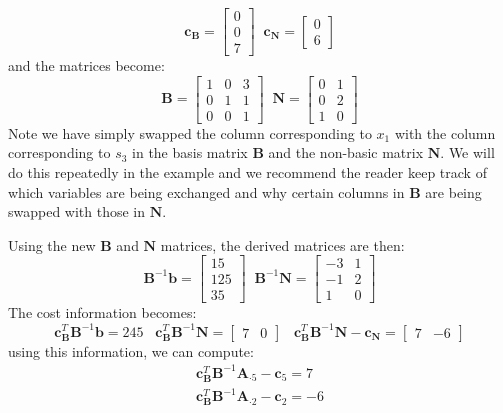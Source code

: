 \begin{example}
\begin{displaymath}
\mathbf{c_B} = \begin{bmatrix}0\\0\\7\end{bmatrix}\;\;
\mathbf{c_N} = \begin{bmatrix}0\\6\end{bmatrix}
\end{displaymath}
and the matrices become:
\begin{displaymath}
\mathbf{B} = \begin{bmatrix}
1 & 0 & 3\\
0 & 1 & 1\\
0 & 0 & 1
\end{bmatrix}\;\;
\mathbf{N} = \begin{bmatrix}
0 & 1\\
0 & 2\\
1 & 0
\end{bmatrix}
\end{displaymath}
Note we have simply swapped the column corresponding to $x_1$ with the column corresponding to $s_3$ in the basis matrix $\mathbf{B}$ and the non-basic matrix $\mathbf{N}$. We will do this repeatedly in the example and we recommend the reader keep track of which variables are being exchanged and why certain columns in $\mathbf{B}$ are being swapped with those in $\mathbf{N}$. 

Using the new $\mathbf{B}$ and $\mathbf{N}$ matrices, the derived matrices are then:
\begin{displaymath}
\mathbf{B}^{-1}\mathbf{b} = \begin{bmatrix}15\\125\\35\end{bmatrix}\;\;
\mathbf{B}^{-1}\mathbf{N} = \begin{bmatrix}
-3 & 1\\
-1 & 2\\
1 & 0
\end{bmatrix}
\end{displaymath}
The cost information becomes:
\begin{displaymath}
\mathbf{c}_\mathbf{B}^T\mathbf{B}^{-1}\mathbf{b} = 245 \;\;\;
\mathbf{c}_\mathbf{B}^T\mathbf{B}^{-1}\mathbf{N} = \begin{bmatrix}7 & 0\end{bmatrix}\;\;\;
\mathbf{c}_\mathbf{B}^T\mathbf{B}^{-1}\mathbf{N} - \mathbf{c_N} = 
\begin{bmatrix}7 & -6\end{bmatrix}
\end{displaymath}
using this information, we can compute: 
\begin{gather*}
\mathbf{c}_\mathbf{B}^T\mathbf{B}^{-1}\mathbf{A}_{\cdot 5}-\mathbf{c}_5 = 7\\
\mathbf{c}_\mathbf{B}^T\mathbf{B}^{-1}\mathbf{A}_{\cdot 2}-\mathbf{c}_2 = -6
\end{gather*}


\end{example}
